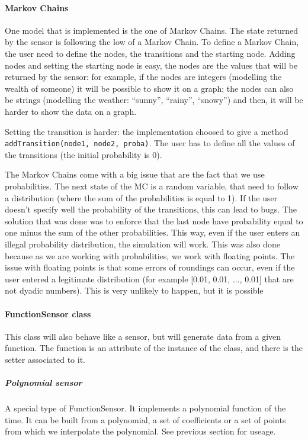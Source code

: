 \paragraph{Markov Chains}

One model that is implemented is the one of Markov Chains. The state returned
by the sensor is following the low of a Markov Chain. To define a Markov
Chain, the user need to define the nodes, the transitions and the starting
node. Adding nodes and setting the starting node is easy, the nodes are the
values that will be returned by the sensor: for example, if the nodes are
integers (modelling the wealth of someone) it will be possible to show it
on a graph; the nodes can also be strings (modelling the weather: ``sunny'',
``rainy'', ``snowy'') and then, it will be harder to show the data on a graph.

Setting the transition is harder: the implementation choosed to give a method
\verb!addTransition(node1, node2, proba)!. The user has to define all the
values of the transitions (the initial probability is 0).

The Markov Chains come with a big issue that are the fact that we use
probabilities. The next state of the MC is a random variable, that need to
follow a distribution (where the sum of the probabilities is equal to 1). If
the user doesn't specify well the probability of the transitions, this can lead
to bugs. The solution that was done was to enforce that the last node have
probability equal to one minus the sum of the other probabilities. This way,
even if the user enters an illegal probability distribution, the simulation
will work.
This was also done because as we are working with probabilities, we work
with floating points. The issue with floating points is that some errors of
roundings can occur, even if the user entered a legitimate distribution (for
example [0.01, 0.01, ..., 0.01] that are not dyadic numbers). This is very
unlikely to happen, but it is possible

\paragraph{FunctionSensor class}

This class will also behave like a sensor, but will generate data from a given
function. The function is an attribute of the instance of the class, and there
is the setter associated to it.

\subparagraph{Polynomial sensor}

A special type of FunctionSensor. It implements a polynomial function of
the time. It can be built from a polynomial, a set of coefficients or a set
of points from which we interpolate the polynomial. See previous section for
useage.

